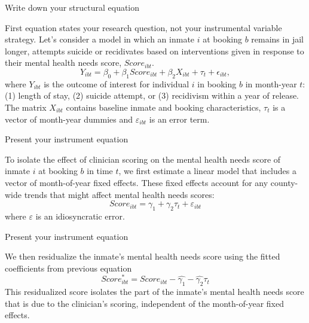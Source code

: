 \documentclass{beamer}
\begin{document}
\begin{frame}{Write down your structural equation}

First equation states your research question, not your instrumental variable strategy.  Let's consider a model in which an inmate $i$ at booking $b$ remains in jail longer, attempts suicide or recidivates based on interventions given in response to their mental health needs score, $Score_{ibt}$. 
\begin{equation}
    Y_{ibt} = \beta_0 + \beta_1 Score_{ibt} + \beta_2 X_{ibt} + \tau_t + \epsilon_{ibt},
    \label{eq:ols}
\end{equation}where $Y_{ibt}$ is the outcome of interest for individual $i$ in booking $b$ in month-year $t$: (1) length of stay, (2) suicide attempt, or (3) recidivism within a year of release.  The matrix $X_{ibt}$ contains baseline inmate and booking characteristics, $\tau_t$ is a vector of month-year dummies and $\varepsilon_{ibt}$ is an error term.  

\end{frame}

\begin{frame}{Present your instrument equation}

To isolate the effect of clinician scoring on the mental health needs score of inmate $i$ at booking $b$ in time $t$, we first estimate a linear model that includes a vector of month-of-year fixed effects. These fixed effects account for any county-wide trends that might affect mental health needs scores:
\begin{equation}
    \label{eq:residual}
    Score_{ibt} = \gamma_1 + \gamma_2 \tau_t + \varepsilon_{ibt} 
\end{equation}where $\varepsilon$ is an idiosyncratic error.  
\end{frame}

\begin{frame}{Present your instrument equation}

We then residualize the inmate's mental health needs score using the fitted coefficients from previous equation
\begin{equation}
    \label{eq:residual2}
    Score^{*}_{ibt} = Score_{ibt} - \widehat{\gamma_1} - \widehat{\gamma_2} \tau_{t}
\end{equation}
This residualized score isolates the part of the inmate's mental health needs score that is due to the clinician's scoring, independent of the month-of-year fixed effects. 

\end{frame}
\end{document}
